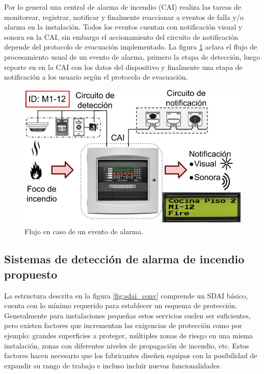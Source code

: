 Por lo general una central de alarma de incendio (CAI) realiza las tareas de monitorear, registrar, notificar y finalmente reaccionar a eventos de falla y/o alarma en la instalación. Todos los eventos cuentan con notificación visual y sonora en la CAI, sin embargo el accionamiento del circuito de notificación depende del protocolo de evacuación implementado. La figura \ref{fig:flujo_conv} aclara el flujo de procesamiento usual de un evento de alarma, primero la etapa de detección, luego reporte en en la CAI con los datos del dispositivo y finalmente una etapa de notificación a los usuario según el protocolo de evacuación.

\begin{figure}[ht]
    \centering
    \includegraphics[scale=.45]{./Figures/flujo_conv.jpg}
    \caption{Flujo en caso de un evento de alarma.}
    \label{fig:flujo_conv}
\end{figure}


\subsection{Sistemas de detección de alarma de incendio propuesto}
%
La estructura descrita en la figura \ref{fig:sdai_conv} comprende un SDAI básico, cuenta con lo mínimo requerido para establecer un esquema de protección. Generalmente para instalaciones pequeñas estos servicios suelen ser suficientes, pero existen factores que incrementan las exigencias de protección como por ejemplo: grandes superficies a proteger, múltiples zonas de riesgo en una misma instalación, zonas con diferentes niveles de propagación de incendio, etc. Estos factores hacen necesario que los fabricantes diseñen equipos con la posibilidad de expandir su rango de trabajo e incluso incluir nuevas funcionalidades.

